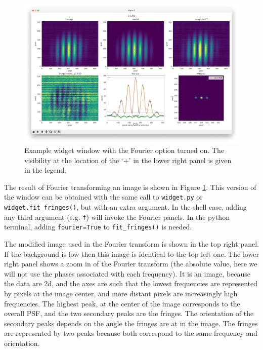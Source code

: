 \documentclass[11pt]{article}
\begin{document}
\begin{figure}[h]
    \centering
   \includegraphics[width=1\textwidth]{widget-fourier.png}
    \caption{Example widget window with the Fourier option turned on. The visibility at the location of the `+' in the lower right panel is given in the legend.}
    \label{fig:widget-f}
\end{figure}

The result of Fourier transforming an image is shown in Figure \ref{fig:widget-f}. This version of the window can be obtained with the same call to \texttt{widget.py} or \texttt{widget.fit\_fringes()}, but with an extra argument. In the shell case, adding any third argument (e.g. \texttt{f}) will invoke the Fourier panels. In the python terminal, adding \texttt{fourier=True} to \texttt{fit\_fringes()} is needed.

The modified image used in the Fourier transform is shown in the top right panel. If the background is low then this image is identical to the top left one. The lower right panel shows a zoom in of the Fourier transform (the absolute value, here we will not use the phases associated with each frequency). It is an image, because the data are 2d, and the axes are such that the lowest frequencies are represented by pixels at the image center, and more distant pixels are increasingly high frequencies. The highest peak, at the center of the image corresponds to the overall PSF, and the two secondary peaks are the fringes. The orientation of the secondary peaks depends on the angle the fringes are at in the image. The fringes are represented by two peaks because both correspond to the same frequency and orientation.
\end{document}
